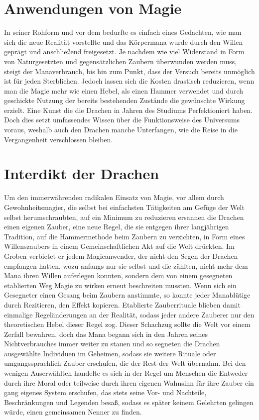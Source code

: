 \documentclass[a4paper,12pt,oneside]{book}
\begin{document}
\chapter{Anwendungen von Magie}
In seiner Rohform und vor dem  bedurfte es einfach eines Gedachten, wie man sich die neue Realität vorstellte und das Körpermana wurde durch den Willen geprägt und anschließend freigesetzt. Je nachdem wie viel Widerstand in Form von Naturgesetzten und gegensätzlichen Zaubern überwunden werden muss, steigt der Manaverbrauch, bis hin zum Punkt, dass der Versuch bereits unmöglich ist für jeden Sterblichen. Jedoch lassen sich die Kosten drastisch reduzieren, wenn man die Magie mehr wie einen Hebel, als einen Hammer verwendet und durch geschickte Nutzung der bereits bestehenden Zustände die gewünschte Wirkung erzielt. Eine Kunst die die Drachen in Jahren des Studiums Perfektioniert haben. Doch dies setzt umfassendes Wissen über die Funktionsweise des Universums voraus, weshalb auch den Drachen manche Unterfangen, wie die Reise in die Vergangenheit verschlossen bleiben.

\chapter{Interdikt der Drachen}\label{Interdikt der Drachen}
Um den immerwährenden radikalen Einsatz von Magie, vor allem durch Gewohnheitsmagier, die selbst bei einfachsten Tätigkeiten am Gefüge der Welt selbst herumschraubten, auf ein Minimum zu reduzieren ersannen die Drachen einen eigenen Zauber, eine neue Regel, die sie entgegen ihrer langjährigen Tradition, auf die Hammermethode beim Zaubern zu verzichten, in Form eines Willenszaubers in einem Gemeinschaftlichen Akt auf die Welt drückten. Im Groben verbietet er jedem Magieanwender, der nicht den Segen der Drachen empfangen hatten, wozu anfangs nur sie selbst und die  zählten, nicht mehr dem Mana ihren Willen auferlegen konnten, sondern dem von einem gesegneten etablierten Weg Magie zu wirken erneut beschreiten mussten. Wenn sich ein Gesegneter einen Gesang beim Zaubern anstimmte, so konnte jeder Manablütige durch Rezitieren, den Effekt kopieren. Etablierte Zauberrituale blieben damit einmalige Regeländerungen an der Realität, sodass jeder andere Zauberer nur den theoretischen Hebel dieser Regel zog. Dieser Schachzug sollte die Welt vor einem Zerfall bewahren, doch das Mana begann sich in den Jahren seines Nichtverbrauches immer weiter zu stauen und so segneten die Drachen ausgewählte Individuen im Geheimen, sodass sie weitere Rituale oder umgangssprachlich Zauber erschufen, die der Rest der Welt übernahm. Bei den wenigen Auserwählten handelte es sich in der Regel um Menschen die Entweder durch ihre Moral oder teilweise durch ihren eigenen Wahnsinn für ihre Zauber ein gang eigenes System erschufen, das stets seine Vor- und Nachteile, Beschränkungen und Legenden besaß, sodass es später keinem Gelehrten gelingen würde, einen gemeinsamen Nenner zu finden.
\end{document}
